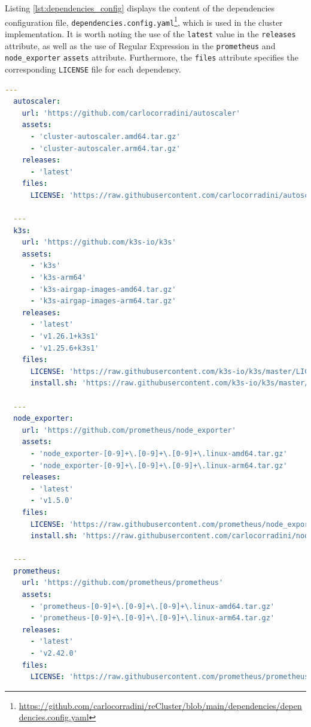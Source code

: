 Listing \ref{lst:dependencies_config} displays the content of the dependencies configuration
file, \texttt{dependencies.config.yaml}\footnote{\url{https://github.com/carlocorradini/reCluster/blob/main/dependencies/dependencies.config.yaml}},
which is used in the cluster implementation. It is worth noting the use of the \texttt{latest}
value in the \texttt{releases} attribute, as well as the use of Regular
Expression in the \texttt{prometheus} and \texttt{node\_exporter} \texttt{assets}
attribute. Furthermore, the \texttt{files} attribute specifies the corresponding
\texttt{LICENSE} file for each dependency.

\begin{lstlisting}[language=yaml, alsoletter={.}, morekeywords={[2]{autoscaler, k3s, node_exporter, prometheus, url, assets, releases, files, LICENSE, install.sh}}, xleftmargin=\parindent, label={lst:dependencies_config}, caption=Content of dependencies configuration file]
  ---
  autoscaler:
    url: 'https://github.com/carlocorradini/autoscaler'
    assets:
      - 'cluster-autoscaler.amd64.tar.gz'
      - 'cluster-autoscaler.arm64.tar.gz'
    releases:
      - 'latest'
    files:
      LICENSE: 'https://raw.githubusercontent.com/carlocorradini/autoscaler/master/LICENSE'

  ---
  k3s:
    url: 'https://github.com/k3s-io/k3s'
    assets:
      - 'k3s'
      - 'k3s-arm64'
      - 'k3s-airgap-images-amd64.tar.gz'
      - 'k3s-airgap-images-arm64.tar.gz'
    releases:
      - 'latest'
      - 'v1.26.1+k3s1'
      - 'v1.25.6+k3s1'
    files:
      LICENSE: 'https://raw.githubusercontent.com/k3s-io/k3s/master/LICENSE'
      install.sh: 'https://raw.githubusercontent.com/k3s-io/k3s/master/install.sh'

  ---
  node_exporter:
    url: 'https://github.com/prometheus/node_exporter'
    assets:
      - 'node_exporter-[0-9]+\.[0-9]+\.[0-9]+\.linux-amd64.tar.gz'
      - 'node_exporter-[0-9]+\.[0-9]+\.[0-9]+\.linux-arm64.tar.gz'
    releases:
      - 'latest'
      - 'v1.5.0'
    files:
      LICENSE: 'https://raw.githubusercontent.com/prometheus/node_exporter/master/LICENSE'
      install.sh: 'https://raw.githubusercontent.com/carlocorradini/node_exporter_installer/main/                  install.sh'

  ---
  prometheus:
    url: 'https://github.com/prometheus/prometheus'
    assets:
      - 'prometheus-[0-9]+\.[0-9]+\.[0-9]+\.linux-amd64.tar.gz'
      - 'prometheus-[0-9]+\.[0-9]+\.[0-9]+\.linux-arm64.tar.gz'
    releases:
      - 'latest'
      - 'v2.42.0'
    files:
      LICENSE: 'https://raw.githubusercontent.com/prometheus/prometheus/main/LICENSE'
\end{lstlisting}

